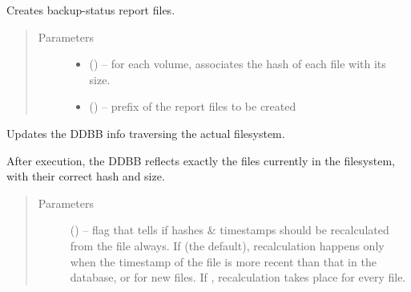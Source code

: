 \documentclass[letterpaper,10pt,english]{sphinxmanual}
\begin{document}
\begin{fulllineitems}
\begin{fulllineitems}
\begin{quote}
\begin{description}
\end{description}\end{quote}

\end{fulllineitems}


\begin{fulllineitems}
\label{\detokenize{index:fsbackup.fileDB.FileDB.reportStatusToFile}}
Creates backup-status report files.
\begin{quote}\begin{description}
\item[{Parameters}] \leavevmode\begin{itemize}
\item {} 
 () -- for each volume, associates the hash of each file with its size.

\item {} 
 () -- prefix of the report files to be created

\end{itemize}

\end{description}\end{quote}

\end{fulllineitems}


\begin{fulllineitems}
\label{\detokenize{index:fsbackup.fileDB.FileDB.update}}
Updates the DDBB info traversing the actual filesystem.

After execution, the DDBB reflects exactly the files currently in the filesystem,
with their correct hash and size.
\begin{quote}\begin{description}
\item[{Parameters}] \leavevmode
{} () -- flag that tells if hashes \& timestamps should be recalculated from the file always.
If  (the default), recalculation happens only when the timestamp of the file is more recent than that
in the database, or for new files. If , recalculation takes place for every file.


\end{description}
\end{quote}
\end{fulllineitems}
\end{fulllineitems}
\end{document}
